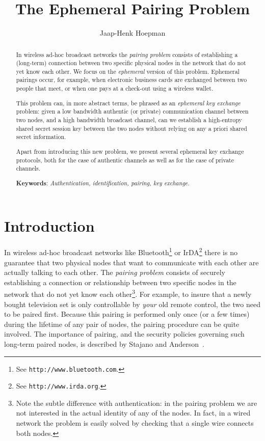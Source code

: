 \documentclass[runningheads,envcountsame,envcountsect,oribibl]{llncs}
\title{The Ephemeral Pairing Problem\version{$Id: pairing.tex,v 1.11 2003/11/24 11:34:49 hoepman Exp $}}
\author{Jaap-Henk Hoepman}
\institute{Department of Computer Science, University of Nijmegen\\
  P.O.Box 9010, 6500 GL \ Nijmegen,
  the Netherlands\\ \email{jhh@cs.kun.nl}}
\begin{document}
\maketitle



\begin{abstract}
In wireless ad-hoc broadcast networks the \emph{pairing problem} consists of
establishing a (long-term) connection
between two specific physical nodes in the network that do not yet know each
other.  We focus on the \emph{ephemeral} version of this problem. Ephemeral
pairings occur, for example, when electronic business cards are exchanged
between two people that meet, or when one pays at a check-out using a wireless
wallet.

This problem can, in more abstract terms, be phrased as an \emph{ephemeral key
exchange} problem: given a low bandwidth authentic (or private) communication
channel between two nodes, and a high bandwidth broadcast channel, can we
establish a high-entropy shared secret session key between the two nodes
without relying on any a priori shared secret information.

Apart from introducing this new problem, we present several ephemeral key
exchange protocols, both for the case of authentic channels as well as for the
case of private channels.

\medskip
\textbf{Keywords}: \textit{Authentication, identification, pairing, key exchange.}
\end{abstract}

\section{Introduction}

In wireless ad-hoc broadcast networks like 
Bluetooth\footnote{
  See \texttt{http://www.bluetooth.com}.
}
or
IrDA\footnote{
  See \texttt{http://www.irda.org}.
}
there is no guarantee that two physical nodes that want to
communicate with each other are actually talking to each other.  
The \emph{pairing problem} consists of securely establishing
a connection or relationship between two specific nodes in the network that do
not yet know each other\footnote{
  Note the subtle difference with authentication: in the pairing problem we are
  not interested in the actual identity of any of the nodes. In fact, in a
  wired network the problem is easily solved by checking that a single wire
  connects both nodes.
}.
For example, to insure that a newly bought television
set is only controllable by \emph{your} old remote control, the two need to be
paired first. Because this pairing is performed only once (or a few times)
during the lifetime of any pair of nodes, the pairing procedure can be quite
involved.
The importance of pairing, and the security policies governing such long-term
paired nodes, is described by Stajano and Anderson~\cite{StaA99}.
\end{document}
